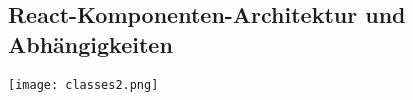 \subsection{React-Komponenten-Architektur und Abhängigkeiten}
\label{app:classes}
\begin{center}
\texttt{[image: classes2.png]}
\end{center}